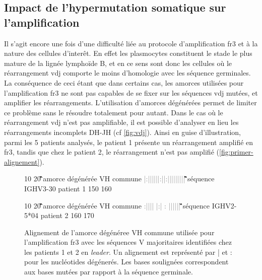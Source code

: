 \subsection{Impact de l'hypermutation somatique sur l'amplification}

Il s'agit encore une fois d'une difficulté liée au protocole d'amplification
\gls{fr}3 et à la nature des cellules d'interêt. En effet les plasmocytes
constituent le stade le plus mature de la lignée lymphoïde B, et en ce sens
sont donc les cellules où le réarrangement \gls{vdj} comporte le moins
d'homologie avec les séquence germinales. La conséquence de ceci étant que dans
certains cas, les amorces utilisées pour l'amplification \gls{fr}3 ne sont pas
capables de se fixer sur les séquences \gls{vdj} mutées, et amplifier les
réarrangements. L'utilisation d'amorces dégénérées permet de limiter ce
problème sans le résoudre totalement pour autant. Dans le cas où le
réarrangement \gls{vdj} n'est pas amplifiable, il est possible d'analyser en
lieu les réarrangements incomplets DH-JH (cf \autoref{fig:vdj}). Ainsi en guise
d'illustration, parmi les 5 patients analysés, le patient 1 présente un
réarrangement amplifié en \gls{fr}3, tandis que chez le patient 2, le
réarrangement n'est pas amplifié (\autoref{fig:primer-alignement}).

\begin{figure}[H]
    \centering
    \begin{ColoredVerbatim}
                10         20 
        \G\Hbase\G\G\A\C\A\C\N\G\C\Y\G\T\G\T\A\T\T\A\C amorce dégénérée VH commune
        \textcolor{gray}{|:||||||:||:|||||||||}
        \G\A\G\G\A\C\A\C\G\G\C\T\G\T\G\T\A\T\T\A\C séquence IGHV3-30 patient 1
           150       160

                10        20 
        \G\Hbase\G\G\A\C\A\C\N\G\C\Y\G\T\G\T\A\T\T\A\C amorce dégénérée VH commune
        \textcolor{gray}{ :|||| |:| :   ||||||}
        \A\T\G\G\A\C\Tb\C\A\G\G\C\A\C\Tb\T\A\T\T\A\C séquence IGHV2-5*04 patient 2
              160       170
    \end{ColoredVerbatim}
    \caption{
        Alignement de l'amorce dégénéree VH commune utilisée pour l'amplification \gls{fr}3 
        avec les séquences V majoritaires identifiées chez les patients 1 et 2 en \textit{leader}. 
        Un alignement est représenté par | et : pour les nucléotides dégénerés. Les bases soulignées 
        correspondent aux bases mutées par rapport à la séquence germinale.
    }
    \label{fig:primer-alignement}
\end{figure}

